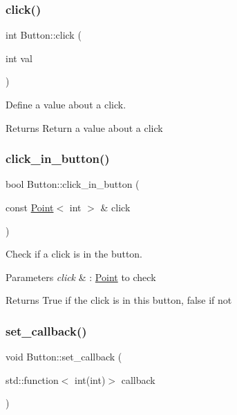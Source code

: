 \subsubsection{\texorpdfstring{click()}{click()}}
{\footnotesize\ttfamily int Button\+::click (\begin{DoxyParamCaption}\item[{int}]{val }\end{DoxyParamCaption})}



Define a value about a click. 

\begin{DoxyReturn}{Returns}
Return a value about a click 
\end{DoxyReturn}
\mbox{\label{classButton_acf7ec691fccf7fc66863a6bb24d31ce5}} 
\subsubsection{\texorpdfstring{click\+\_\+in\+\_\+button()}{click\_in\_button()}}
{\footnotesize\ttfamily bool Button\+::click\+\_\+in\+\_\+button (\begin{DoxyParamCaption}\item[{const \hyperlink{classPoint}{Point}$<$ int $>$ \&}]{click }\end{DoxyParamCaption})}



Check if a click is in the button. 


\begin{DoxyParams}{Parameters}
{\em click} & \+: \hyperlink{classPoint}{Point} to check \\
\hline
\end{DoxyParams}
\begin{DoxyReturn}{Returns}
True if the click is in this button, false if not 
\end{DoxyReturn}
\mbox{\label{classButton_aff79964a98ce6c76d0ece8502a830985}} 
\subsubsection{\texorpdfstring{set\+\_\+callback()}{set\_callback()}}
{\footnotesize\ttfamily void Button\+::set\+\_\+callback (\begin{DoxyParamCaption}\item[{std\+::function$<$ int(int)$>$}]{callback }\end{DoxyParamCaption})}



